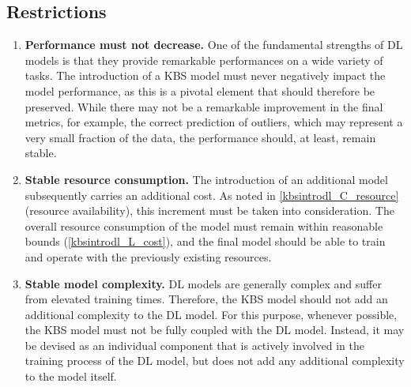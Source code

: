 \subsection{Restrictions}
\begin{enumerate} [start=1,label={\bfseries R\arabic*.}]
    \item \label{kbsintrodl_R_performance} \textbf{Performance must not decrease.} One of the fundamental strengths of DL models is that they provide remarkable performances on a wide variety of tasks. The introduction of a KBS model must never negatively impact the model performance, as this is a pivotal element that should therefore be preserved. While there may not be a remarkable improvement in the final metrics, for example, the correct prediction of outliers, which may represent a very small fraction of the data, the performance should, at least, remain stable.
    
    \item \label{kbsintrodl_R_resource} \textbf{Stable resource consumption.} The introduction of an additional model subsequently carries an additional cost. As noted in \ref{kbsintrodl_C_resource} (resource availability), this increment must be taken into consideration. The overall resource consumption of the model must remain within reasonable bounds (\ref{kbsintrodl_L_cost}), and the final model should be able to train and operate with the previously existing resources.
    
    \item \label{kbsintrodl_R_complexity} \textbf{Stable model complexity.} DL models are generally complex and suffer from elevated training times. Therefore, the KBS model should not add an additional complexity to the DL model. For this purpose, whenever possible, the KBS model must not be fully coupled with the DL model. Instead, it may be devised as an individual component that is actively involved in the training process of the DL model, but does not add any additional complexity to the model itself. 
    
\end{enumerate}
